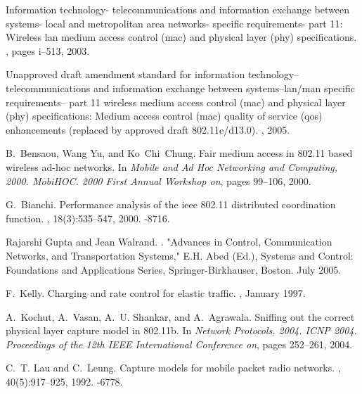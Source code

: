 \documentclass[letterpaper, 10 pt, conference]{ieeeconf}
\begin{document}

\begin{thebibliography}{10}

Information technology- telecommunications and information exchange between
  systems- local and metropolitan area networks- specific requirements- part
  11: Wireless lan medium access control (mac) and physical layer (phy)
  specifications.
, pages i--513, 2003.

Unapproved draft amendment standard for information technology--
  telecommunications and information exchange between systems--lan/man specific
  requirements-- part 11 wireless medium access control (mac) and physical
  layer (phy) specifications: Medium access control (mac) quality of service
  (qos) enhancements (replaced by approved draft 802.11e/d13.0).
, 2005.

B.~Bensaou, Wang Yu, and Ko~Chi~Chung.
\newblock Fair medium access in 802.11 based wireless ad-hoc networks.
\newblock In {\em Mobile and Ad Hoc Networking and Computing, 2000. MobiHOC.
  2000 First Annual Workshop on}, pages 99--106, 2000.

G.~Bianchi.
\newblock Performance analysis of the ieee 802.11 distributed coordination
  function.
,
  18(3):535--547, 2000.
-8716.

Rajarshi Gupta and Jean Walrand.
.
\newblock "Advances in Control, Communication Networks, and Transportation
  Systems," E.H. Abed (Ed.), Systems and Control: Foundations and Applications
  Series, Springer-Birkhauser, Boston. July 2005.

F.~Kelly.
\newblock Charging and rate control for elastic traffic.
, January
  1997.

A.~Kochut, A.~Vasan, A.~U. Shankar, and A.~Agrawala.
\newblock Sniffing out the correct physical layer capture model in 802.11b.
\newblock In {\em Network Protocols, 2004. ICNP 2004. Proceedings of the 12th
  IEEE International Conference on}, pages 252--261, 2004.

C.~T. Lau and C.~Leung.
\newblock Capture models for mobile packet radio networks.
, 40(5):917--925, 1992.
-6778.


\end{thebibliography}
\end{document}
